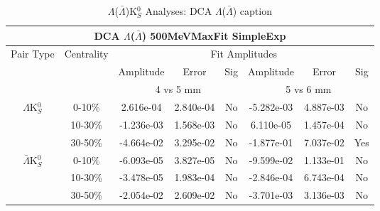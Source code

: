 \documentclass[../AnalysisNoteJBuxton.tex]{subfiles}
\begin{document}
\begin{table}
 \centering
 \begin{tabular}{|c|c|c|c|c||c|c|c|}
  \multicolumn{8}{c}{DCA $\Lambda$($\bar{\Lambda}$) 500MeVMaxFit SimpleExp} \\
  \hline
  \multirow{3}{*}{Pair Type} & \multirow{3}{*}{Centrality} & \multicolumn{6}{c|}{Fit Amplitudes} \\
  \cline{3-8}
   & & Amplitude & Error & Sig & Amplitude & Error & Sig \\
  \cline{3-8}
   & & \multicolumn{3}{c||}{4 vs 5 mm} & \multicolumn{3}{c|}{5 vs 6 mm} \\
  \hline  
  \multirow{3}{*}{$\Lambda$K$^{0}_{S}$}  
   &  0-10\% & 2.616e-04 & 2.840e-04 & No & -5.282e-03 & 4.887e-03 & No \\
   & 10-30\% & -1.236e-03 & 1.568e-03 & No & 6.110e-05 & 1.457e-04 & No \\
   & 30-50\% & -4.664e-02 & 3.295e-02 & No & -1.877e-01 & 7.037e-02 & Yes \\
  \hline  
  \multirow{3}{*}{$\bar{\Lambda}$K$^{0}_{S}$}  
   &  0-10\% & -6.093e-05 & 3.827e-05 & No & -9.599e-02 & 1.133e-01 & No \\
   & 10-30\% & -3.478e-05 & 1.983e-04 & No & -2.846e-04 & 6.743e-04 & No \\
   & 30-50\% & -2.054e-02 & 2.609e-02 & No & -3.701e-03 & 3.136e-03 & No \\
  \hline
 \end{tabular}
 \caption{$\Lambda$($\bar{\Lambda}$)K$^{0}_{S}$ Analyses: DCA $\Lambda$($\bar{\Lambda}$) caption}
 \label{tab:LamDcaLamK0_500MeVMaxFit_SimpleExp}
\end{table}

\clearpage
\end{document}
